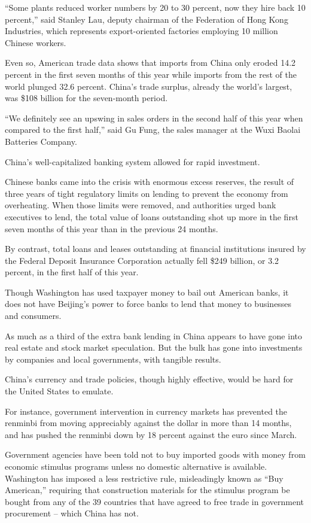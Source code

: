 ﻿\documentclass[12pt]{article}
\begin{document}
``Some plants reduced worker numbers by 20 to 30 percent, now they hire back 10 percent,'' said
Stanley Lau, deputy chairman of the Federation of Hong Kong Industries, which represents
export-oriented factories employing 10 million Chinese workers.

Even so, American trade data shows that imports from China only eroded\cite{erode} 14.2 percent in
the first seven months of this year while imports from the rest of the world plunged 32.6 percent.
China's trade surplus, already the world's largest, was \$108 billion for the seven-month period.

``We definitely see an upswing in sales orders in the second half of this year when compared to the
first half,'' said Gu Fung, the sales manager at the Wuxi Baolai Batteries Company.

China's well-capitalized banking system allowed for rapid investment.

Chinese banks came into the crisis with enormous excess reserves, the result of three years of tight
regulatory limits on lending to prevent the economy from overheating. When those limits were
removed, and authorities urged bank executives to lend, the total value of loans outstanding shot up
more in the first seven months of this year than in the previous 24 months.

By contrast, total loans and leases outstanding at financial institutions insured by the Federal
Deposit Insurance Corporation actually fell \$249 billion, or 3.2 percent, in the first half of this
year.

Though Washington has used taxpayer money to bail out American banks, it does not have Beijing's
power to force banks to lend that money to businesses and consumers.

As much as a third of the extra bank lending in China appears to have gone into real estate and
stock market speculation. But the bulk has gone into investments by companies and local governments,
with tangible\cite{tangible} results.

China's currency and trade policies, though highly effective, would be hard for the United States to
emulate.

For instance, government intervention in currency markets has prevented the renminbi from moving
appreciably against the dollar in more than 14 months, and has pushed the renminbi down by 18
percent against the euro since March.

Government agencies have been told not to buy imported goods with money from economic stimulus
programs unless no domestic alternative is available. Washington has imposed a less restrictive
rule, misleadingly known as ``Buy American,'' requiring that construction materials for the stimulus
program be bought from any of the 39 countries that have agreed to free trade in government
procurement -- which China has not.
\end{document}
